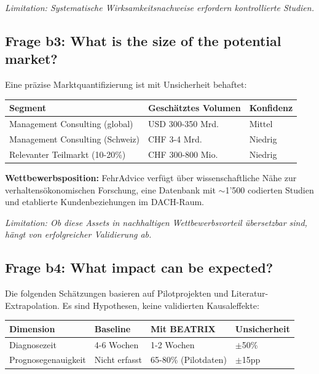 \documentclass[11pt,a4paper]{article}
\newcommand{\limitation}[1]{\textcolor{limitation}{\textit{Limitation: #1}}}
\begin{document}
\limitation{Systematische Wirksamkeitsnachweise erfordern kontrollierte Studien.}

\subsection{Frage b3: What is the size of the potential market?}

Eine präzise Marktquantifizierung ist mit Unsicherheit behaftet:

\begin{table}[h]
\centering
\begin{tabular}{@{}L{5cm}L{4cm}C{3cm}@{}}
\toprule
\textbf{Segment} & \textbf{Geschätztes Volumen} & \textbf{Konfidenz} \\
\midrule
Management Consulting (global) & USD 300-350 Mrd. & Mittel \\
Management Consulting (Schweiz) & CHF 3-4 Mrd. & Niedrig \\
Relevanter Teilmarkt (10-20\%) & CHF 300-800 Mio. & Niedrig \\
\bottomrule
\end{tabular}
\end{table}

\textbf{Wettbewerbsposition:} FehrAdvice verfügt über wissenschaftliche Nähe zur verhaltensökonomischen Forschung, eine Datenbank mit $\sim$1'500 codierten Studien und etablierte Kundenbeziehungen im DACH-Raum.

\limitation{Ob diese Assets in nachhaltigen Wettbewerbsvorteil übersetzbar sind, hängt von erfolgreicher Validierung ab.}

\subsection{Frage b4: What impact can be expected?}

Die folgenden Schätzungen basieren auf Pilotprojekten und Literatur-Extrapolation. Es sind Hypothesen, keine validierten Kausaleffekte:

\begin{table}[h]
\centering
\begin{tabular}{@{}L{4cm}L{3.5cm}L{4cm}C{2cm}@{}}
\toprule
\textbf{Dimension} & \textbf{Baseline} & \textbf{Mit BEATRIX} & \textbf{Unsicherheit} \\
\midrule
Diagnosezeit & 4-6 Wochen & 1-2 Wochen & $\pm$50\% \\
Prognosegenauigkeit & Nicht erfasst & 65-80\% (Pilotdaten) & $\pm$15pp \\
\bottomrule
\end{tabular}
\end{table}
\end{document}

